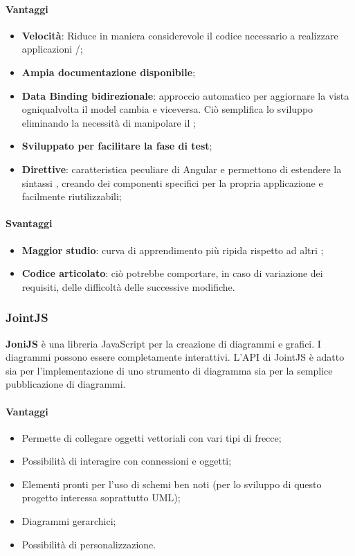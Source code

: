 \paragraph{Vantaggi}
\begin{itemize}
\item \textbf{Velocità}: Riduce in maniera considerevole il codice necessario a realizzare applicazioni /;
\item \textbf{Ampia documentazione disponibile};
\item \textbf{Data Binding bidirezionale}: approccio automatico per aggiornare la vista ogniqualvolta il model cambia e viceversa. Ciò semplifica lo sviluppo eliminando la necessità di manipolare il ;
\item \textbf{Sviluppato per facilitare la fase di test};
\item \textbf{Direttive}: caratteristica peculiare di Angular e permettono di estendere la sintassi  , creando dei componenti specifici per la propria applicazione e facilmente riutilizzabili;
\end{itemize}

\paragraph{Svantaggi}
\begin{itemize}
\item \textbf{Maggior studio}: curva di apprendimento più ripida rispetto ad altri ;
\item \textbf{Codice articolato}: ciò potrebbe comportare, in caso di variazione dei requisiti, delle difficoltà delle successive modifiche.
\end{itemize}

	\subsubsection{JointJS}
	\textbf{JoniJS} è una libreria JavaScript per la creazione di diagrammi e grafici. I diagrammi possono essere completamente interattivi. L'API di JointJS è adatto sia per l'implementazione di uno strumento di diagramma sia per la semplice pubblicazione di diagrammi.

\paragraph{Vantaggi}
\begin{itemize}
\item Permette di collegare oggetti vettoriali con vari tipi di frecce;
\item Possibilità di interagire con connessioni e oggetti;
\item Elementi pronti per l'uso di schemi ben noti (per lo sviluppo di questo progetto interessa soprattutto UML);
\item Diagrammi gerarchici;
\item Possibilità di personalizzazione.
\end{itemize}

